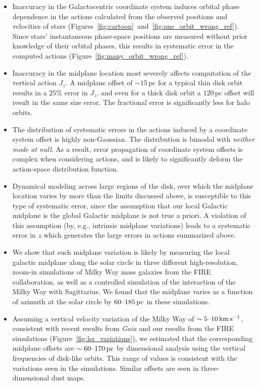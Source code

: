 \documentclass[twocolumn]{aastex62}
\newcommand{\pc}{\text{pc}}
\newcommand{\kms}{\text{km}\,\text{s}^{-1}}
\begin{document}
\begin{itemize}
\item Inaccuracy in the Galactocentric coordinate
system induces orbital phase dependence in the actions calculated from the
observed positions and velocities of stars
(Figures~\ref{fig:cartoon}~and~\ref{fig:one_orbit_wrong_ref}). Since stars'
instantaneous phase-space positions are measured without prior knowledge of
their orbital phases, this results in systematic error in the computed actions
(Figure~\ref{fig:many_orbit_wrong_ref}).

\item Inaccuracy in the midplane location most severely affects computation of
the vertical action $J_z$. A midplane offset of $\sim15\,\pc$ for a typical
thin disk orbit results in a $25\%$ error in $J_z$, and even for a thick disk
orbit a $120\,\pc$ offset will result in the same size error. The fractional
error is significantly less for halo orbits.

\item The distribution of systematic errors in the actions induced by a
coordinate system offset is highly non-Gaussian. The distribution is bimodal
with \emph{neither mode at null}. As a result, error propagation of coordinate
system offsets is complex when considering actions, and is likely to
significantly deform the action-space distribution function.

\item Dynamical modeling across large regions of the disk, over which the
midplane location varies by more than the limits discussed above, is
susceptible to this type of systematic error, since the assumption that our
local Galactic midplane is the global Galactic midplane is not true a priori.
A violation of this assumption (by, e.g., intrinsic midplane variations) leads
to a systematic error in $z$ which generates the large errors in actions
summarized above.

\item 
We show that such midplane variation is likely by measuring the local galactic
midplane along the solar circle in three different high-resolution, zoom-in
simulations of Milky Way mass galaxies from the FIRE collaboration, as well as
a controlled simulation of the interaction of the Milky Way with Sagittarius.
We found that the midplane varies as a function of azimuth at the solar circle
by $60\textup{--}185\,\pc$ in these simulations.

\item Assuming a vertical velocity variation of the Milky Way of
$\sim5\textup{--}10\,\kms$, consistent with recent results from \textit{Gaia}
and our results from the FIRE simulations (Figure~\ref{fig:lsr_variations}),
we estimated that the corresponding midplane offsets are
$\sim60\textup{--}170\,\pc$ by dimensional analysis using the vertical
frequencies of disk-like orbits. This range of values is consistent with the
variations seen in the simulations. Similar offsets are seen in
three-dimensional dust maps.


\end{itemize}
\end{document}
